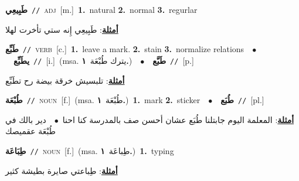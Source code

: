 \documentclass[10pt,a4paper,twoside]{article} %
\begin{document}
\begin{multicols}{2}
{{{{{{{{{{{{{\setlength\topsep{0pt}\textbf{\foreignlanguage{arabic}{طَبِيعِي}}\ {\color{gray}\texttt{//}\color{black}}\ \textsc{adj}\ [m.]\ \textbf{1.}~natural  \textbf{2.}~normal  \textbf{3.}~regurlar\  \begin{flushright}\color{gray}\foreignlanguage{arabic}{\textbf{\underline{\foreignlanguage{arabic}{أمثلة}}}: طَبِيعِي إِنه ستي تأخرت لهلا}\end{flushright}\color{black}} \vspace{2mm}

{\setlength\topsep{0pt}\textbf{\foreignlanguage{arabic}{طَبِّع}}\ {\color{gray}\texttt{//}\color{black}}\ \textsc{verb}\ [c.]\ \textbf{1.}~leave a mark.  \textbf{2.}~stain  \textbf{3.}~normalize relations\ \ $\bullet$\ \ \setlength\topsep{0pt}\textbf{\foreignlanguage{arabic}{يطَبِّع}}\ {\color{gray}\texttt{//}\color{black}}\ [i.]\ \color{gray}(msa. \foreignlanguage{arabic}{يترك طُبْعَة}~\foreignlanguage{arabic}{\textbf{١.}})\color{black}\ \ $\bullet$\ \ \setlength\topsep{0pt}\textbf{\foreignlanguage{arabic}{طَبَّع}}\ {\color{gray}\texttt{//}\color{black}}\ [p.]\  \begin{flushright}\color{gray}\foreignlanguage{arabic}{\textbf{\underline{\foreignlanguage{arabic}{أمثلة}}}: تلبسيش خرقة بيضة رح تطَبِّع}\end{flushright}\color{black}} \vspace{2mm}

{\setlength\topsep{0pt}\textbf{\foreignlanguage{arabic}{طُبْعَة}}\ {\color{gray}\texttt{//}\color{black}}\ \textsc{noun}\ [f.]\ \color{gray}(msa. \foreignlanguage{arabic}{طُبْعَة}~\foreignlanguage{arabic}{\textbf{١.}})\color{black}\ \textbf{1.}~mark  \textbf{2.}~sticker\ \ $\bullet$\ \ \setlength\topsep{0pt}\textbf{\foreignlanguage{arabic}{طُبَع}}\ {\color{gray}\texttt{//}\color{black}}\ [pl.]\  \begin{flushright}\color{gray}\foreignlanguage{arabic}{\textbf{\underline{\foreignlanguage{arabic}{أمثلة}}}: المعلمة اليوم جابتلنا طُبَع عشان أحسن صف بالمدرسة كنا احنا\ $\bullet$\ \  دير بالك في طُبْعَة عقميصك}\end{flushright}\color{black}} \vspace{2mm}

{\setlength\topsep{0pt}\textbf{\foreignlanguage{arabic}{طِبَاعَة}}\ {\color{gray}\texttt{//}\color{black}}\ \textsc{noun}\ [f.]\ \color{gray}(msa. \foreignlanguage{arabic}{طِباعَة}~\foreignlanguage{arabic}{\textbf{١.}})\color{black}\ \textbf{1.}~typing\  \begin{flushright}\color{gray}\foreignlanguage{arabic}{\textbf{\underline{\foreignlanguage{arabic}{أمثلة}}}: طِباعتي صايرة بطيشة كثير}\end{flushright}\color{black}} \vspace{2mm}

}}}}}}}}}}}}
\end{multicols}
\end{document}
